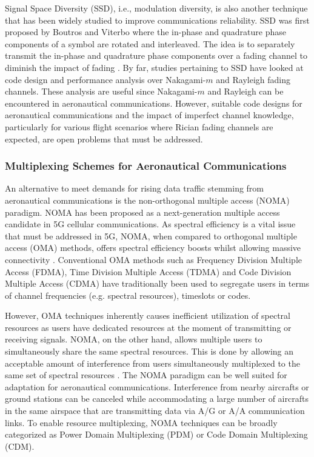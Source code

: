 Signal Space Diversity (SSD), i.e., modulation diversity, is also another technique that has been widely studied to improve communications reliability. SSD was first proposed by Boutros and Viterbo \cite{boutros1998signal} where the in-phase and quadrature phase components of a symbol are rotated and interleaved. The idea is to separately transmit the in-phase and quadrature phase components over a fading channel to diminish the impact of fading \cite{boutros1998signal}. By far, studies pertaining to SSD have looked at code design \cite{mohammed2012modulation} and performance analysis over Nakagami-$m$ \cite{lu2012bit} and Rayleigh \cite{sokun2017spectrally} fading channels. These analysis are useful since Nakagami-$m$ and Rayleigh can be encountered in aeronautical communications. However, suitable code designs for aeronautical communications and the impact of imperfect channel knowledge, particularly for various flight scenarios where Rician fading channels are expected, are open problems that must be addressed.

\subsubsection{Multiplexing Schemes for Aeronautical Communications}

An alternative to meet demands for rising data traffic stemming from aeronautical communications is the non-orthogonal multiple access (NOMA) paradigm. NOMA has been proposed as a next-generation multiple access candidate \cite{dai2015non} in 5G cellular communications. As spectral efficiency is a vital issue that must be addressed in 5G, NOMA, when compared to orthogonal multiple access (OMA) methods, offers spectral efficiency boosts whilst allowing massive connectivity \cite{dai2015non}. Conventional OMA methods such as Frequency Division Multiple Access (FDMA), Time Division Multiple Access (TDMA) and Code Division Multiple Access (CDMA) have traditionally been used to segregate users in terms of channel frequencies (e.g. spectral resources), timeslots or codes. 

However, OMA techniques inherently causes inefficient utilization of spectral resources as users have dedicated resources at the moment of transmitting or receiving signals. NOMA, on the other hand, allows multiple users to simultaneously share the same spectral resources. This is done by allowing an acceptable amount of interference from users simultaneously multiplexed to the same set of spectral resources \cite{dai2015non}. The NOMA paradigm can be well suited for adaptation for aeronautical communications. Interference from nearby aircrafts or ground stations can be canceled while accommodating a large number of aircrafts in the same airspace that are transmitting data via A/G or A/A communication links. To enable resource multiplexing, NOMA techniques can be broadly categorized as Power Domain Multiplexing (PDM) or Code Domain Multiplexing (CDM). 

